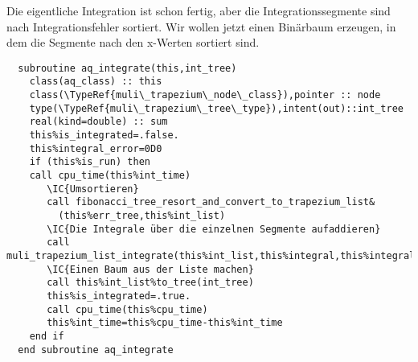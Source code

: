 Die eigentliche Integration ist schon fertig, aber die Integrationssegmente sind nach Integrationsfehler sortiert. Wir wollen jetzt einen Binärbaum erzeugen, in dem die Segmente nach den x-Werten sortiert sind.
\begin{Verbatim}
  subroutine aq_integrate(this,int_tree)
    class(aq_class) :: this
    class(\TypeRef{muli\_trapezium\_node\_class}),pointer :: node
    type(\TypeRef{muli\_trapezium\_tree\_type}),intent(out)::int_tree
    real(kind=double) :: sum
    this%is_integrated=.false.
    this%integral_error=0D0
    if (this%is_run) then
    call cpu_time(this%int_time)
       \IC{Umsortieren}
       call fibonacci_tree_resort_and_convert_to_trapezium_list&
         (this%err_tree,this%int_list)
       \IC{Die Integrale über die einzelnen Segmente aufaddieren}
       call muli_trapezium_list_integrate(this%int_list,this%integral,this%integral_error)
       \IC{Einen Baum aus der Liste machen}
       call this%int_list%to_tree(int_tree)
       this%is_integrated=.true.
       call cpu_time(this%cpu_time)
       this%int_time=this%cpu_time-this%int_time
    end if
  end subroutine aq_integrate
\end{Verbatim}
\MethodsNTB
{}

